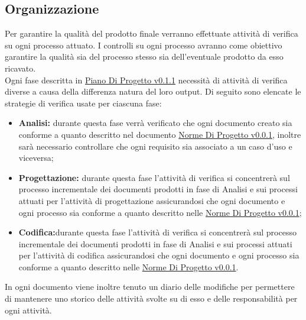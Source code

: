 \documentclass{scalatekids-article}
\begin{document}
\subsection{Organizzazione}
Per garantire la qualità del prodotto finale verranno effettuate attività di verifica su ogni processo attuato. I controlli su ogni processo avranno come obiettivo garantire la qualità sia del processo stesso sia dell'eventuale prodotto da esso ricavato.\\
Ogni fase descritta in \href{run:./PianoDiProgetto\_v0.1.1.pdf}{Piano Di Progetto v0.1.1} necessità di attività di verifica diverse a causa della differenza natura del loro output. Di seguito sono elencate le strategie di verifica usate per ciascuna fase:
\begin{itemize}
\item\textbf{Analisi:} durante questa fase verrà verificato che ogni documento creato sia conforme a quanto descritto nel documento \href{run:../Interni/NormeDiProgetto\_v0.0.1.pdf}{Norme Di Progetto v0.0.1}, inoltre sarà necessario controllare che ogni requisito sia associato a un caso d'uso e viceversa;
\item\textbf{Progettazione:} durante questa fase l'attività di verifica si concentrerà sul processo incrementale dei documenti prodotti in fase di Analisi e sui processi attuati per l'attività di progettazione assicurandosi che ogni documento e ogni processo sia conforme a quanto descritto nelle \href{run:../Interni/NormeDiProgetto\_v0.0.1.pdf}{Norme Di Progetto v0.0.1};
\item\textbf{Codifica:}durante questa fase l'attività di verifica si concentrerà sul processo incrementale dei documenti prodotti in fase di Analisi e sui processi attuati per l'attività di codifica assicurandosi che ogni documento e ogni processo sia conforme a quanto descritto nelle \href{run:../Interni/NormeDiProgetto\_v0.0.1.pdf}{Norme Di Progetto v0.0.1}.
\end{itemize}
In ogni documento viene inoltre tenuto un diario delle modifiche per permettere di mantenere uno storico delle attività svolte su di esso e delle responsabilità per ogni attività.
\end{document}
